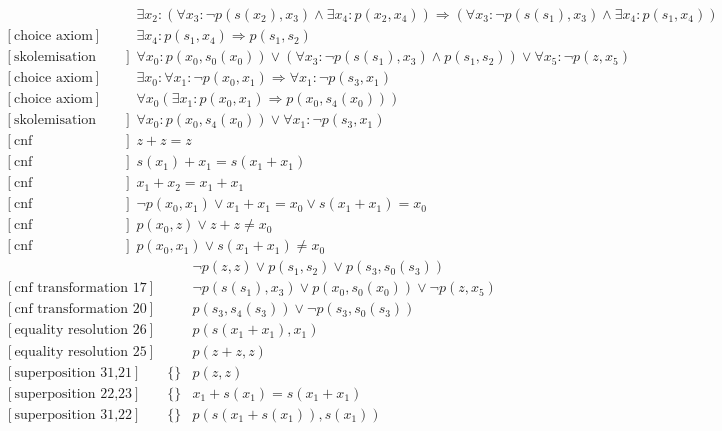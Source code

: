 \documentclass[onehalfspacing]{article}
\begin{document}
\begin{landscape}
\begin{align}
		[\text{choice axiom}] &&	 \exists x_2 : (\forall x_3 : \neg p(s(x_2),x_3) \wedge \exists x_4 : p(x_2,x_4)) \Rightarrow (\forall x_3 : \neg p(s(s_1),x_3) \wedge \exists x_4 : p(s_1,x_4)) \\
		[\text{choice axiom}] &&	 \exists x_4 : p(s_1,x_4) \Rightarrow p(s_1,s_2) \\
		[\text{skolemisation 13,16,15,14}] &&	 \forall x_0 : p(x_0,s_0(x_0)) \vee (\forall x_3 : \neg p(s(s_1),x_3) \wedge p(s_1,s_2)) \vee \forall x_5 : \neg p(z,x_5) \\
		[\text{choice axiom}] &&	 \exists x_0 : \forall x_1 : \neg p(x_0,x_1) \Rightarrow \forall x_1 : \neg p(s_3,x_1) \\
		[\text{choice axiom}] &&     \forall x_0(\exists x_1: p(x_0, x_1)\Rightarrow p(x_0, s_4(x_0)))\\
		[\text{skolemisation 9,17,18}] &&	 \forall x_0: p(x_0, s_4(x_0))\vee\forall x_1 : \neg p(s_3,x_1) \\
		[\text{cnf transformation 1}] &&	 z + z = z \\
		[\text{cnf transformation 2}] &&	 s(x_1) + x_1 = s(x_1 + x_1) \\
		[\text{cnf transformation 3}] &&	 x_1 + x_2 = x_1 + x_1 \\
		[\text{cnf transformation 11}] &&	 \neg p(x_0,x_1) \vee x_1 + x_1 = x_0 \vee s(x_1 + x_1) = x_0 \\
		[\text{cnf transformation 11}] &&	 p(x_0,z) \vee z + z \neq x_0 \\
		[\text{cnf transformation 11}] &&	 p(x_0,x_1) \vee s(x_1 + x_1) \neq x_0
	\end{align}
	\begin{align}
		[\text{cnf transformation 17}] &&	 \neg p(z,z) \vee p(s_1,s_2) \vee p(s_3,s_0(s_3)) \\
		[\text{cnf transformation 17}] &&	 \neg p(s(s_1),x_3) \vee p(x_0,s_0(x_0)) \vee \neg p(z,x_5) \\
		[\text{cnf transformation 20}] &&	 p(s_3, s_4(s_3))\vee\neg p(s_3,s_0(s_3)) \\
		[\text{equality resolution 26}] &&	 p(s(x_1 + x_1),x_1) \\
		[\text{equality resolution 25}] &&	 p(z + z, z) \\
		[\text{superposition 31,21}] &\{\}&	 p(z,z) \\
		[\text{superposition 22,23}] &\{\}&	 x_1 + s(x_1) = s(x_1+x_1) \\
		[\text{superposition 31,22}] &\{\}&	 p(s(x_1+s(x_1)),s(x_1)) \\

\end{align}
\end{landscape}
\end{document}
